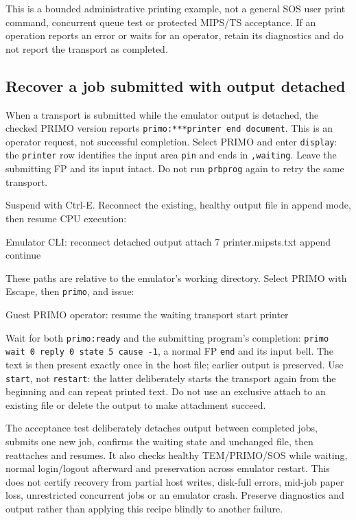 This is a bounded administrative printing example, not a general SOS user
print command, concurrent queue test or protected
MIPS/TS acceptance. If an operation reports an error or waits for an operator,
retain its diagnostics and do not report the transport as completed.

\subsection{Recover a job submitted with output detached}
\label{mips-ts-printer-recovery}

When a transport is submitted while the emulator output is detached, the
checked PRIMO version reports \texttt{primo:***printer end document}.
This is an operator request, not successful completion. Select PRIMO and
enter \texttt{display}: the \texttt{printer} row identifies the input area
\texttt{pin} and ends in \texttt{,waiting}. Leave the submitting FP and its
input intact. Do not run \texttt{prbprog} again to retry the same transport.

Suspend with Ctrl-E. Reconnect the existing, healthy output file in append
mode, then resume CPU execution:

\begin{commandexample}{Emulator CLI: reconnect detached output}
attach 7 printer.mipsts.txt append
continue
\end{commandexample}

These paths are relative to the emulator's working directory. Select PRIMO
with Escape, then \texttt{primo}, and issue:

\begin{commandexample}{Guest PRIMO operator: resume the waiting transport}
start printer
\end{commandexample}

Wait for both \texttt{primo:ready} and the submitting program's completion:
\texttt{primo wait 0 reply 0 state 5 cause -1}, a normal FP \texttt{end}
and its input bell. The text is then present exactly once in the host file;
earlier output is preserved. Use \texttt{start}, not \texttt{restart}:
the latter deliberately starts the transport again from the beginning and
can repeat printed text. Do not use an exclusive attach to an existing file
or delete the output to make attachment succeed.

The acceptance test deliberately detaches output between completed jobs,
submits one new job, confirms the waiting state and unchanged file, then
reattaches and resumes. It also checks healthy TEM/PRIMO/SOS while waiting,
normal login/logout afterward and preservation across emulator restart.
This does not certify recovery from partial host writes, disk-full errors,
mid-job paper loss, unrestricted concurrent jobs or an emulator crash. Preserve diagnostics
and output rather than applying this recipe blindly to another failure.

